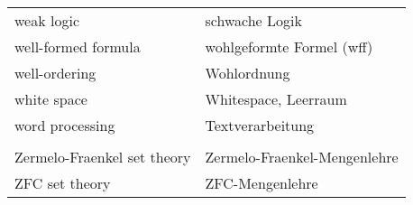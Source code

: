\begin{longtabu}   { @{} X[l] X[l] }
    weak logic & schwache Logik \\
    well-formed formula & wohlgeformte Formel (wff) \\
    well-ordering & Wohlordnung \\
    white space & Whitespace, Leerraum \\
    word processing & Textverarbeitung \\
     & \\
    Zermelo-Fraenkel set theory & Zermelo-Fraenkel-{\allowbreak}Mengenlehre \\
    ZFC set theory & ZFC-Mengenlehre \\    
\end{longtabu}

%
%
%
%
%

\cleardoublepage
{}  %


%

\raggedright
\cleardoublepage
{} %




